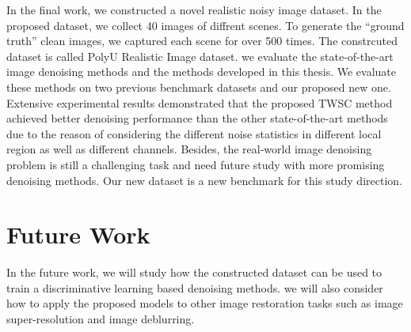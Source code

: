 In the final work, we constructed a novel realistic noisy image dataset. In the proposed dataset, we collect 40 images of diffrent scenes. To generate the ``ground truth'' clean images, we captured each scene for over 500 times. The constrcuted dataset is called PolyU Realistic Image dataset. we evaluate the state-of-the-art image denoising methods and the methods developed in this thesis. We evaluate these methods on two previous benchmark datasets and our proposed new one. Extensive experimental results demonstrated that the proposed TWSC method achieved better denoising performance than the other state-of-the-art methods due to the reason of considering the different noise statistics in different local region as well as different channels. Besides, the real-world image denoising problem is still a challenging task and need future study with more promising denoising methods. Our new dataset is a new benchmark for this study direction.



\section{Future Work}
\label{sec:conclusions:future}

In the future work, we will study how the constructed dataset can be used to train a discriminative learning based denoising methods. we will also consider how to apply the proposed models to other image restoration tasks such as image super-resolution and image deblurring.
